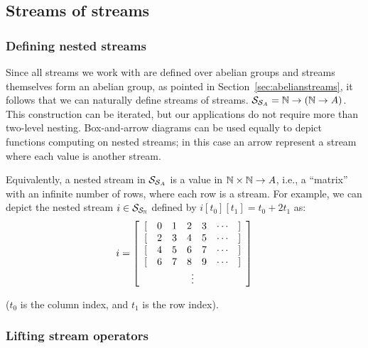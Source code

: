 \subsection{Streams of streams}\label{sec:nested}

\subsubsection{Defining nested streams}

Since all streams we work with are defined over abelian groups
and streams themselves form an abelian group, as pointed in Section~\ref{sec:abelianstreams},
it follows that we can naturally define streams of streams.
$\mathcal{S}_{\mathcal{S}_{A}} = \mathbb{N} \rightarrow (\mathbb{N} \rightarrow A)$.  This construction
can be iterated, but our applications do not require more than
two-level nesting.  Box-and-arrow diagrams can be used equally to
depict functions computing on nested streams; in this case an
arrow represent a stream where each value is another stream.

\newcommand{\ssa}[1]{
\setsepchar{ }
\readlist\arg{#1}
\begin{bmatrix}
   \begin{array}{ccccccc}
        {[} & \arg[1] & \arg[2] & \arg[3] & \arg[4] & \cdots & {]} \\
        {[} & \arg[5] & \arg[6] & \arg[7] & \arg[8] & \cdots & {]} \\
        {[} & \arg[9] & \arg[10] & \arg[11] & \arg[12] & \cdots & {]} \\
        {[} & \arg[13] & \arg[14] & \arg[15] & \arg[16] & \cdots & {]} \\
        \multicolumn{7}{c}{\vdots}
   \end{array}
\end{bmatrix}
}

Equivalently, a nested stream in $\mathcal{S}_{\mathcal{S}_{A}}$ is a value in
$\mathbb{N} \times \mathbb{N} \to A$, i.e., a ``matrix''
with an infinite number of rows, where each row is a stream.
For example, we can depict the nested stream
$i \in \mathcal{S}_{\mathcal{S}_{\mathbb{N}}}$ defined by $i[t_0][t_1] = t_0 + 2 t_1$ as:
$$ i = \ssa{0 1 2 3 2 3 4 5 4 5 6 7 6 7 8 9} $$

\noindent ($t_0$ is the column index, and $t_1$ is the row index).

\subsubsection{Lifting stream operators}

